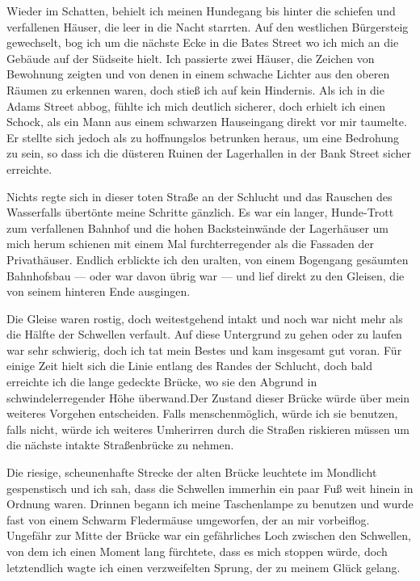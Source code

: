 Wieder im Schatten, behielt ich meinen Hundegang bis hinter die schiefen und verfallenen Häuser, die leer in die Nacht starrten. Auf den westlichen Bürgersteig gewechselt, bog ich um die nächste Ecke in die Bates Street wo ich mich an die Gebäude auf der Südseite hielt. Ich passierte zwei Häuser, die Zeichen von Bewohnung zeigten und von denen in einem schwache Lichter aus den oberen Räumen zu erkennen waren, doch stieß ich auf kein Hindernis. Als ich in die Adams Street abbog, fühlte ich mich deutlich sicherer, doch erhielt ich einen Schock, als ein Mann aus einem schwarzen Hauseingang direkt vor mir taumelte. Er stellte sich jedoch als zu hoffnungslos betrunken heraus, um eine Bedrohung zu sein, so dass ich die düsteren Ruinen der Lagerhallen in der Bank Street sicher erreichte.

Nichts regte sich in dieser toten Straße an der Schlucht und das Rauschen des Wasserfalls übertönte meine Schritte gänzlich. Es war ein langer, Hunde-Trott zum verfallenen Bahnhof und die hohen Backsteinwände der Lagerhäuser um mich herum schienen mit einem Mal furchterregender als die Fassaden der Privathäuser. Endlich erblickte ich den uralten, von einem Bogengang gesäumten Bahnhofsbau --- oder war davon übrig war --- und lief direkt zu den Gleisen, die von seinem hinteren Ende ausgingen.

Die Gleise waren rostig, doch weitestgehend intakt und noch war nicht mehr als die Hälfte der Schwellen verfault. Auf diese Untergrund zu gehen oder zu laufen war sehr schwierig, doch ich tat mein Bestes und kam insgesamt gut voran. Für einige Zeit hielt sich die Linie entlang des Randes der Schlucht, doch bald erreichte ich die lange gedeckte Brücke, wo sie den Abgrund in schwindelerregender Höhe überwand.Der Zustand dieser Brücke würde über mein weiteres Vorgehen entscheiden. Falls menschenmöglich, würde ich sie benutzen, falls nicht, würde ich weiteres Umherirren durch die Straßen riskieren müssen um die nächste intakte Straßenbrücke zu nehmen.

Die riesige, scheunenhafte Strecke der alten Brücke leuchtete im Mondlicht gespenstisch und ich sah, dass die Schwellen immerhin ein paar Fuß weit hinein in Ordnung waren. Drinnen begann ich meine Taschenlampe zu benutzen und wurde fast von einem Schwarm Fledermäuse umgeworfen, der an mir vorbeiflog. Ungefähr zur Mitte der Brücke war ein gefährliches Loch zwischen den Schwellen, von dem ich einen Moment lang fürchtete, dass es mich stoppen würde, doch letztendlich wagte ich einen verzweifelten Sprung, der zu meinem Glück gelang.

